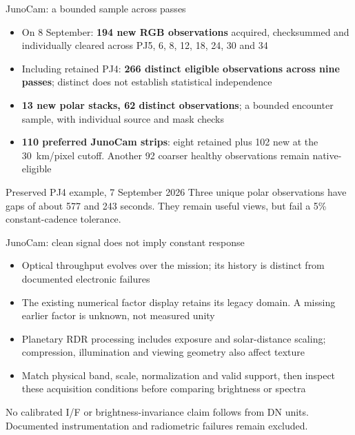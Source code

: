 \documentclass[aspectratio=169,11pt]{beamer}
\newcommand{\currevsec}{}
\newcommand{\revsec}[1]{\gdef\currevsec{#1}}
\begin{document}
\begin{frame}{JunoCam: a bounded sample across passes}
  \revsec{4.18}
\begin{itemize}
    \item On 8 September: \textbf{194 new RGB observations} acquired, checksummed and individually cleared across PJ5, 6, 8, 12, 18, 24, 30 and 34
    \item Including retained PJ4: \textbf{266 distinct eligible observations across nine passes}; distinct does not establish statistical independence
    \item \textbf{13 new polar stacks, 62 distinct observations}; a bounded encounter sample, with individual source and mask checks
    \item \textbf{110 preferred JunoCam strips}: eight retained plus 102 new at the 30~km/pixel cutoff. Another 92 coarser healthy observations remain native-eligible
  \end{itemize}
  \begin{block}{Preserved PJ4 example, 7 September 2026}
    Three unique polar observations have gaps of about 577 and 243 seconds. They remain useful views, but fail a 5\% constant-cadence tolerance.
  \end{block}
\end{frame}

\begin{frame}{JunoCam: clean signal does not imply constant response}
  \revsec{4.18}
  \begin{itemize}
    \item Optical throughput evolves over the mission; its history is distinct from documented electronic failures
    \item The existing numerical factor display retains its legacy domain. A missing earlier factor is unknown, not measured unity
    \item Planetary RDR processing includes exposure and solar-distance scaling; compression, illumination and viewing geometry also affect texture
    \item Match physical band, scale, normalization and valid support, then inspect these acquisition conditions before comparing brightness or spectra
  \end{itemize}
  \vspace{0.2cm}
  No calibrated I/F or brightness-invariance claim follows from DN units. Documented instrumentation and radiometric failures remain excluded.
\end{frame}
\end{document}
